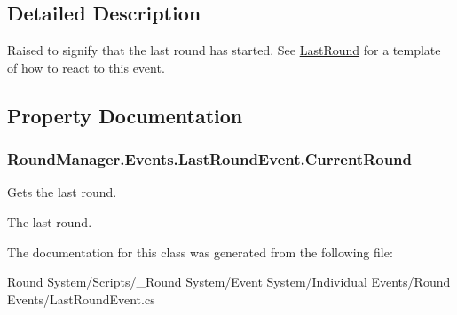 \subsection{Detailed Description}
Raised to signify that the last round has started. See \hyperlink{class_round_manager_1_1_last_round}{Last\+Round} for a template of how to react to this event. 



\subsection{Property Documentation}
\hypertarget{class_round_manager_1_1_events_1_1_last_round_event_a0fbaecd15348421bdfd20f50e1d5a9f1}{}
\subsubsection[{Current\+Round}]{ Round\+Manager.\+Events.\+Last\+Round\+Event.\+Current\+Round\hspace{0.3cm}{\ttfamily [get]}}\label{class_round_manager_1_1_events_1_1_last_round_event_a0fbaecd15348421bdfd20f50e1d5a9f1}


Gets the last round. 

The last round.

The documentation for this class was generated from the following file\+:\begin{DoxyCompactItemize}
\item 
Round System/\+Scripts/\+\_\+\+Round System/\+Event System/\+Individual Events/\+Round Events/Last\+Round\+Event.\+cs\end{DoxyCompactItemize}
